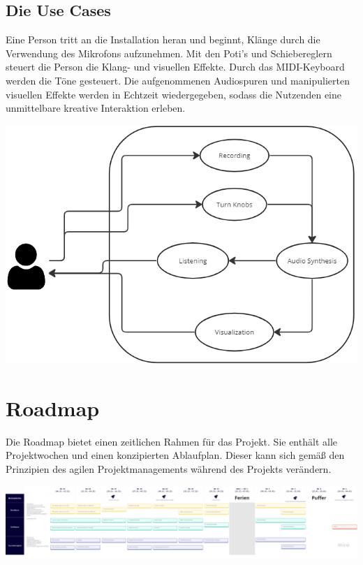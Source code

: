 \documentclass[12pt]{scrartcl}%
\theoremstyle{nonumberplain}
\begin{document}
\subsection{Die Use Cases}
Eine Person tritt an die Installation heran und beginnt, Klänge durch die Verwendung des Mikrofons aufzunehmen. Mit den Poti's und Schiebereglern steuert die Person die Klang- und visuellen Effekte. Durch das MIDI-Keyboard werden die Töne gesteuert. Die aufgenommenen Audiospuren und manipulierten visuellen Effekte werden in Echtzeit wiedergegeben, sodass die Nutzenden eine unmittelbare kreative Interaktion erleben.
\begin{center}
 \includegraphics[scale=0.4]{usecases2.png}
\end{center}
\section{Roadmap}
Die Roadmap bietet einen zeitlichen Rahmen für das Projekt. Sie enthält alle Projektwochen und einen konzipierten Ablaufplan. Dieser kann sich gemäß den Prinzipien des agilen Projektmanagements während des Projekts verändern.
\newpage
\begin{center}
 \includegraphics[scale=0.45, angle=90]{Roadmap_v.2.png}
\end{center}
\end{document}
